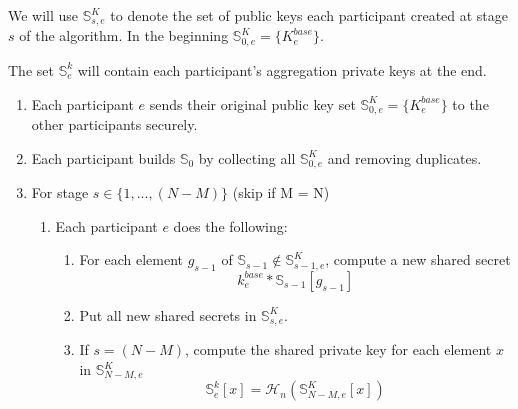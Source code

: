 We will use $\mathbb{S}^K_{s,e}$ to denote the set of public keys each participant created at stage $s$ of the algorithm. In the beginning $\mathbb{S}^K_{0,e} = \{K^{base}_e\}$.

The set $\mathbb{S}^{k}_{e}$ will contain each participant's aggregation private keys at the end.
\begin{enumerate}
    \item Each participant $e$ sends their original public key set $\mathbb{S}^K_{0,e} = \{K^{base}_e\}$ to the other participants securely.
    \item Each participant builds $\mathbb{S}_{0}$ by collecting all $\mathbb{S}^K_{0,e}$ and removing duplicates.
    \item For stage $s \in \{1,...,(N-M)\}$ (skip if M = N)
    \begin{enumerate}
        \item Each participant $e$ does the following:
        \begin{enumerate}
            \item For each element $g_{s-1}$ of $\mathbb{S}_{s-1} \notin \mathbb{S}^K_{s-1,e}$, compute a new shared secret \[k^{base}_e*\mathbb{S}_{s-1}[g_{s-1}]\]
            \item Put all new shared secrets in $\mathbb{S}^K_{s,e}$.
            \item If $s = (N-M)$, compute the shared private key for each element $x$ in $\mathbb{S}^K_{N-M,e}$
            \[\mathbb{S}^{k}_{e}[x] = \mathcal{H}_n(\mathbb{S}^K_{N-M,e}[x])\]


\end{enumerate}
\end{enumerate}
\end{enumerate}

